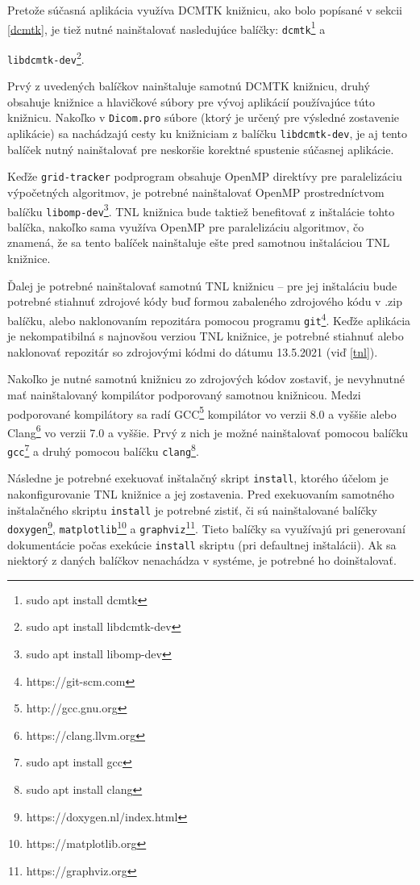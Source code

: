 Pretože súčasná aplikácia využíva DCMTK knižnicu, ako bolo popísané v sekcii \ref{dcmtk}, je tiež nutné nainštalovať nasledujúce balíčky: \texttt{dcmtk}\footnote{sudo apt install dcmtk} a {\texttt{libdcmtk-dev}\footnote{sudo apt install libdcmtk-dev}.

Prvý z uvedených balíčkov nainštaluje samotnú DCMTK knižnicu, druhý obsahuje knižnice a hlavičkové súbory pre vývoj aplikácií používajúce túto knižnicu. Nakoľko v \texttt{Dicom.pro} súbore (ktorý je určený pre výsledné zostavenie aplikácie) sa nachádzajú cesty ku knižniciam z balíčku \texttt{libdcmtk-dev}, je aj tento balíček nutný nainštalovať pre neskoršie korektné spustenie súčasnej aplikácie.

Keďže \texttt{grid-tracker} podprogram obsahuje OpenMP direktívy pre paralelizáciu výpočetných algoritmov, je potrebné nainštalovať OpenMP prostredníctvom balíčku \texttt{libomp-dev}\footnote{sudo apt install libomp-dev}. TNL knižnica bude taktiež benefitovať z inštalácie tohto balíčka, nakoľko sama využíva OpenMP pre paralelizáciu algoritmov, čo znamená, že sa tento balíček nainštaluje ešte pred samotnou inštaláciou TNL knižnice.

Ďalej je potrebné nainštalovať samotnú TNL knižnicu -- pre jej inštaláciu bude potrebné stiahnuť zdrojové kódy buď formou zabaleného zdrojového kódu v .zip balíčku, alebo naklonovaním repozitára pomocou programu \texttt{git}\footnote{https://git-scm.com}. Keďže aplikácia je nekompatibilná s najnovšou verziou TNL knižnice, je potrebné stiahnuť alebo naklonovať repozitár so zdrojovými kódmi do dátumu 13.5.2021 (viď \ref{tnl}).

Nakoľko je nutné samotnú knižnicu zo zdrojových kódov zostaviť, je nevyhnutné mať nainštalovaný kompilátor podporovaný samotnou knižnicou. Medzi podporované kompilátory sa radí GCC\footnote{http://gcc.gnu.org} kompilátor vo verzii 8.0 a vyššie alebo Clang\footnote{https://clang.llvm.org} vo verzii 7.0 a vyššie. Prvý z nich je možné nainštalovať pomocou balíčku \texttt{gcc}\footnote{sudo apt install gcc} a druhý pomocou balíčku \texttt{clang}\footnote{sudo apt install clang}.

Následne je potrebné exekuovať inštalačný skript \texttt{install}, ktorého účelom je nakonfigurovanie TNL knižnice a jej zostavenia.
Pred exekuovaním samotného inštalačného skriptu \texttt{install} je potrebné zistiť, či sú nainštalované balíčky \texttt{doxygen}\footnote{https://doxygen.nl/index.html}, \texttt{matplotlib}\footnote{https://matplotlib.org} a \texttt{graphviz}\footnote{https://graphviz.org}. Tieto balíčky sa využívajú pri generovaní dokumentácie počas exekúcie \texttt{install} skriptu (pri defaultnej inštalácii). Ak sa niektorý z daných balíčkov nenachádza v systéme, je potrebné ho doinštalovať.

}
